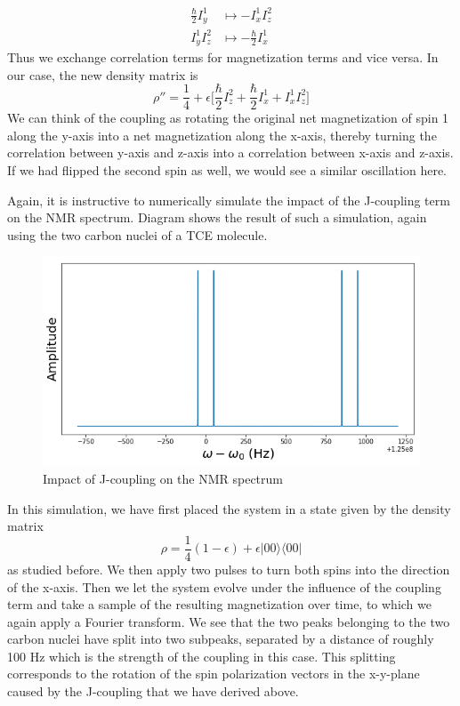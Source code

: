\documentclass[a4paper, draft]{article}
\theoremstyle{own}
\theoremstyle{remark}
\begin{document}
\begin{align*}
\frac{\hbar}{2} I_y^1 &\mapsto - I_x^1 I_z^2 \\
I_y^1 I_z^2  &\mapsto - \frac{\hbar}{2} I_x^1
\end{align*}
Thus we exchange correlation terms for magnetization terms and vice versa. In our case, the new density matrix is
$$
\rho'' = \frac{1}{4} + \epsilon \big[  \frac{\hbar}{2} I_z^2   
+ \frac{\hbar}{2} I_x^1  + I_x^1 I_z^2 \big]
$$
We can think of the coupling as rotating the original net magnetization of spin 1 along the y-axis into a net magnetization along the x-axis, thereby turning the correlation between y-axis and z-axis into a correlation between x-axis and z-axis. If we had flipped the second spin as well, we would see a similar oscillation here.

Again, it is instructive to numerically simulate the impact of the J-coupling term on the NMR spectrum. Diagram shows the result of such a simulation, again using the two carbon nuclei of a TCE molecule.

\begin{figure}[ht]
\centering
\includegraphics[width=0.9\linewidth]{images/TwoCoupledNucleiNMRSignalFFT}
\caption[Impact of J-coupling on the NMR spectrum]{Impact of J-coupling on the NMR spectrum}
\label{fig:TwoCoupledNucleiNMRSignalFFT}
\end{figure}


In this simulation, we have first placed the system in a state given by the density matrix
$$
\rho = \frac{1}{4} (1 - \epsilon) + \epsilon |00 \rangle \langle 00 |
$$
as studied before. We then apply two pulses to turn both spins into the direction of the x-axis. Then we let the system evolve under the influence of the coupling term and take a sample of the resulting magnetization over time, to which we again apply a Fourier transform. We see that the two peaks belonging to the two carbon nuclei have split into two subpeaks, separated by a distance of roughly 100 Hz which is the strength of the coupling in this case. This splitting corresponds to the rotation of the spin polarization vectors in the x-y-plane caused by the J-coupling that we have derived above.
\end{document}
